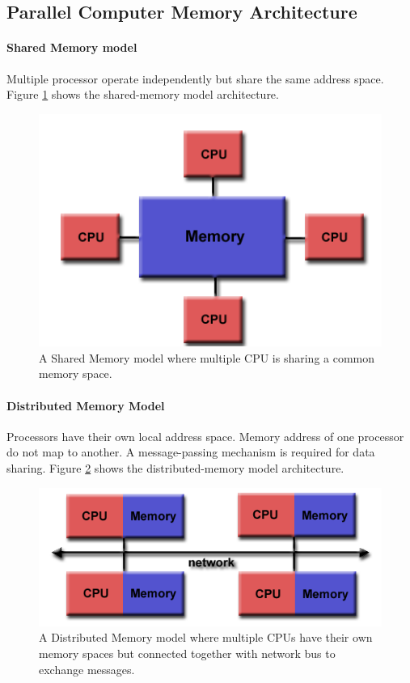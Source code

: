 \subsection{Parallel Computer Memory Architecture}
\paragraph{Shared Memory model}
Multiple processor operate independently but share the same address space. Figure \ref{fig:shared-memory} shows the shared-memory model architecture.

\begin{figure}[!h]
\centering
  \includegraphics[width=.5\linewidth]{figs/shared-memory.png}
  \caption{A Shared Memory model where multiple CPU is sharing a common memory space. \citep{Barney:16}}
  \label{fig:shared-memory}
\end{figure}

\paragraph{Distributed Memory Model}
Processors have their own local address space. Memory address of one processor do not map to another. A message-passing mechanism is required for data sharing. Figure \ref{fig:distributed-memory} shows the distributed-memory model architecture.

\begin{figure}[!h]
\centering
  \includegraphics[width=.5\linewidth]{figs/distributed-memory.png}
  \caption{A Distributed Memory model where multiple CPUs have their own memory spaces but connected together with network bus to exchange messages. \citep{Barney:16}}
  \label{fig:distributed-memory}
\end{figure}


